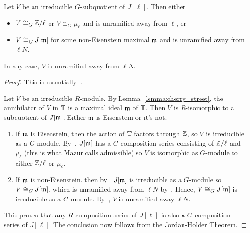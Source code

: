 \documentclass{article}
\begin{document}
\begin{theorem}\label{theorem:irreducible_G_sub}
    Let $V$ be an irreducible $G$-subquotient of $J[\ell]$. Then either
    \begin{itemize}
        \item
            $V\cong_G \mathbb{Z}/\ell$ or $V\cong_G \mu_\ell$ and is unramified away
            from $\ell$, or
        \item 
            $V\cong_G J[\mathfrak{m}]$ for some non-Eisenstein maximal $\mathfrak{m}$ and is
            unramified away from $\ell N$.
    \end{itemize}
    In any case, $V$ is unramified away from $\ell N$.
\end{theorem}
\begin{proof}
    This is essentially~\cite[\S 14]{mazur:eisenstein}. 

    Let $V$ be an irreducible $R$-module. By Lemma~\ref{lemma:cherry_street},
    the annihilator of $V$ in $\mathbb{T}$ is a maximal ideal $\mathfrak{m}$ of $\mathbb{T}$. Then $V$
    is $R$-isomorphic to a subquotient of $J[\mathfrak{m}]$. Either $\mathfrak{m}$ is Eisenstein or
    it's not.
    \begin{enumerate}
        \item
            If $\mathfrak{m}$ is Eisenstein, then the action of $\mathbb{T}$ factors through
            $\mathbb{Z}$, so $V$ is irreducible as a $G$-module. By~\cite[Proposition
            14.1]{mazur:eisenstein}, $J[\mathfrak{m}]$ has a $G$-composition series
            consisting of $\mathbb{Z}/\ell$ and $\mu_\ell$ (this is what Mazur calls
            admissible) so $V$ is isomorphic as $G$-module to either $\mathbb{Z}/\ell$
            or $\mu_\ell$.
        \item
            If $\mathfrak{m}$ is non-Eisenstein, then by~\cite[Proposition
            14.2]{mazur:eisenstein} $J[\mathfrak{m}]$ is irreducible as a $G$-module so
            $V\cong_G J[\mathfrak{m}]$, which is unramified away from $\ell N$
            by~\cite[Theorem 6.7]{deligne-serre}. Hence, $V\cong_G J[\mathfrak{m}]$ is
            irreducible as a $G$-module. By~\cite[Theorem 6.7]{deligne-serre},
            $V$ is unramified away $\ell N$.
    \end{enumerate}
    This proves that any $R$-composition series of $J[\ell]$ is also a
    $G$-composition series of $J[\ell]$. The conclusion now follows from the
    Jordan-Holder Theorem.
\end{proof} 
\end{document}
